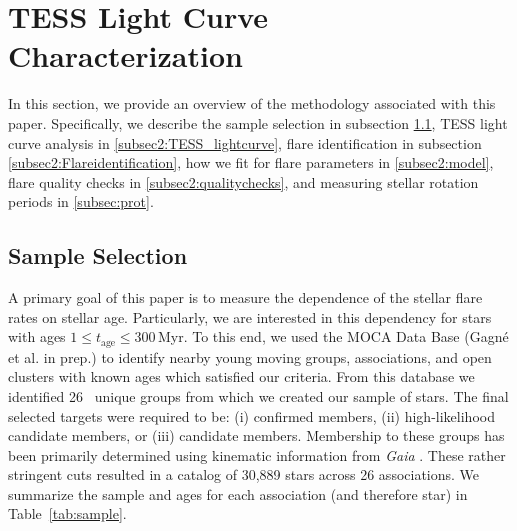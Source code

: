 \documentclass[twocolumn]{aastex631}
\begin{document}
\section{TESS Light Curve Characterization}\label{sec:methods}

In this section, we provide an overview of the methodology associated with this paper. Specifically, we describe the sample selection in subsection \ref{subsec2:sample}, TESS light curve analysis in \ref{subsec2:TESS_lightcurve}, flare identification in subsection \ref{subsec2:Flareidentification}, how we fit for flare parameters in \ref{subsec2:model}, flare quality checks in \ref{subsec2:qualitychecks}, and measuring stellar rotation periods in \ref{subsec:prot}.

\subsection{Sample Selection}\label{subsec2:sample}

A primary goal of this paper is to measure the dependence of the stellar flare rates on stellar age. Particularly, we are interested in this dependency for stars with ages $1 \leq t_\textrm{age} \leq 300$\,Myr. To this end, we used the MOCA Data Base (Gagné et al. in prep.) to identify nearby young moving groups, associations, and open clusters with known ages which satisfied our criteria. From this database we identified 26~ unique groups from which we created our sample of stars. The final selected targets were required to be: (i) confirmed members, (ii) high-likelihood candidate members, or (iii) candidate members. Membership to these groups has been primarily determined using kinematic information from \textit{Gaia} \citep{gaia16, gaia18}. These rather stringent cuts resulted in a catalog of 30,889 stars across 26 associations. We summarize the sample and ages for each association (and therefore star) in Table~\ref{tab:sample}.

\end{document}
